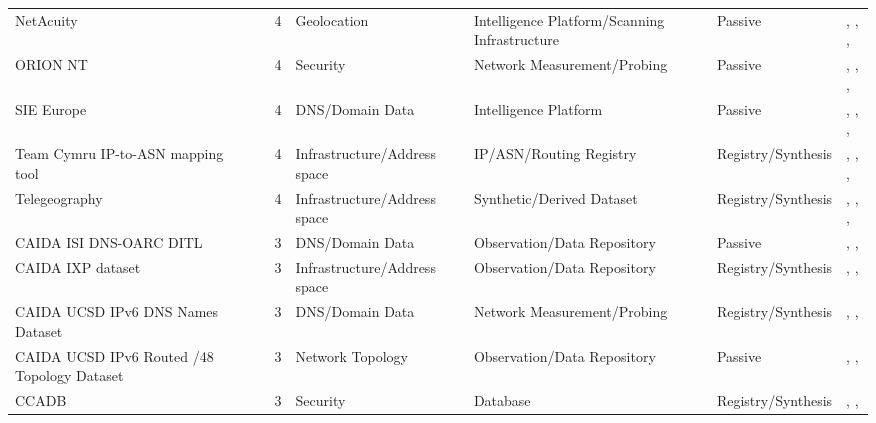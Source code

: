 \documentclass[11pt,a4paper]{article}
\begin{document}
\begin{longtable}{@{}p{}p{}p{}p{}p{}p{}p{}@{}}
NetAcuity & \cite{netacuity} & 4 & Geolocation & Intelligence Platform/Scanning Infrastructure & Passive & \cite{10.1145/3517745.3561425}, \cite{10.1145/3487552.3487822}, \cite{10.1007/978-3-030-72582-2_4}, \cite{10.1007/978-3-030-98785-5_29} \\
ORION NT & \cite{orion-nt} & 4 & Security & Network Measurement/Probing & Passive & \cite{10.1145/3646547.3689012}, \cite{10.1145/3646547.3688451}, \cite{10.1145/3618257.3624818}, \cite{10.1145/3777912.3839831} \\
SIE Europe & \cite{sie-europe} & 4 & DNS/Domain Data & Intelligence Platform & Passive & \cite{10.1145/3646547.3689017}, \cite{10.1007/978-3-031-56249-5_9}, \cite{10.1007/978-3-031-56249-5_10}, \cite{10.1145/3777912.3809157} \\
Team Cymru IP-to-ASN mapping tool & \cite{team-cymru-ip-asn} & 4 & Infrastructure/Address space & IP/ASN/Routing Registry & Registry/Synthesis & \cite{10.1145/3487552.3487854}, \cite{10.1007/978-3-031-28486-1_10}, \cite{10.1007/978-3-031-85960-1_18}, \cite{10.1145/3777912.3839811} \\
Telegeography & \cite{telegeography} & 4 & Infrastructure/Address space & Synthetic/Derived Dataset & Registry/Synthesis & \cite{10.1145/3517745.3561443}, \cite{10.1007/978-3-030-98785-5_29}, \cite{10.1145/3777912.3809135}, \cite{10.1145/3777912.3839834} \\
CAIDA ISI DNS-OARC DITL & \cite{caida-ditl} & 3 & DNS/Domain Data & Observation/Data Repository & Passive & \cite{10.1007/978-3-030-72582-2_32}, \cite{10.1007/978-3-031-28486-1_21}, \cite{10.1145/3777912.3839813} \\
CAIDA IXP dataset & \cite{caida-ixp-dataset} & 3 & Infrastructure/Address space & Observation/Data Repository & Registry/Synthesis & \cite{10.1145/3487552.3487854}, \cite{10.1007/978-3-030-98785-5_29}, \cite{10.1145/3777912.3809137} \\
CAIDA UCSD IPv6 DNS Names Dataset & \cite{caida-dns-names} & 3 & DNS/Domain Data & Network Measurement/Probing & Registry/Synthesis & \cite{10.1145/3646547.3688449}, \cite{10.1007/978-3-031-85960-1_2}, \cite{10.1007/978-3-031-85960-1_3} \\
CAIDA UCSD IPv6 Routed /48 Topology Dataset & \cite{caida-ipv6-routed-48} & 3 & Network Topology & Observation/Data Repository & Passive & \cite{10.1145/3487552.3487829}, \cite{10.1007/978-3-031-56252-5_10}, \cite{10.1145/3646547.3688449} \\
CCADB & \cite{ccadb} & 3 & Security & Database & Registry/Synthesis & \cite{10.1145/3646547.3688415}, \cite{10.1145/3618257.3624815}, \cite{10.1145/3777912.3839820} \\

\end{longtable}
\end{document}

